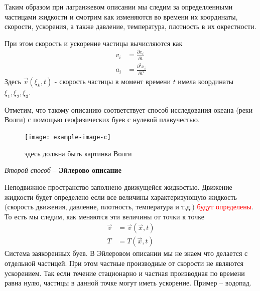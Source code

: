 Таким образом при лагранжевом описании мы следим за определленными частицами жидкости и смотрим как изменяются во времени их координаты,  скорости, ускорения, а также давление, температура, плотность в их окрестности.

При этом скорость и ускорение частицы вычисляются как
\begin{align*}
v_{i} &=\frac{\partial x_{i}}{\partial t} \\
a_{i} &=\frac{\partial^{2} x_{i}}{\partial t^{2}} 
\end{align*}
Здесь $ \vec{v}\left(\xi_{k}, t\right) $ - скорость частицы в момент времени $t$ имела координаты $\xi_1,\xi_2,\xi_3$.

Отметим, что такому описанию соответствует способ исследования океана (реки Волги) с помощью геофизических буев с нулевой плавучестью.
\begin{figure}[h]
	\centering
	\texttt{[image: example-image-c]}
	\caption{здесь должна быть картинка Волги}
	\label{fig:figure3}
\end{figure}
\begin{center}
	{\emph{Второй способ} – \textbf{Эйлерово описание}}
\end{center}

Неподвижное пространство заполнено движущейся жидкостью. Движение жидкости будет определено если все величины характеризующую жидкость (скорость движения, давление, плотность, температура и т.д.) \textcolor{red}{будут определены}.
То есть мы следим, как меняются эти величины от точки к точке
\begin{align*} 
\vec{v} &=\vec{v}(\vec{x}, t) \\
T &=T(\vec{x}, t)
\end{align*}
Система заякоренных буев. 
В Эйлеровом описании мы не знаем что делается с отдельной частицей. При этом частные производные от скорости не являются ускорением. Так если течение стационарно и частная производная по времени  равна нулю, частицы в данной точке могут иметь ускорение. Пример – водопад.

